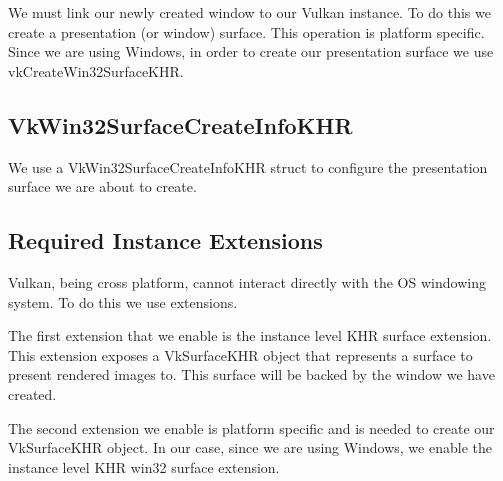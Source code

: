 We must link our newly created window to our Vulkan instance.
To do this we create a presentation (or window) surface.
This operation is platform specific.
Since we are using Windows, in order to create our presentation surface we
use vkCreateWin32SurfaceKHR.

\begin{minipage}{\linewidth}{\noindent}
    
\end{minipage}

\subsection{VkWin32SurfaceCreateInfoKHR}

We use a VkWin32SurfaceCreateInfoKHR struct to configure the presentation
surface we are about to create.

\begin{minipage}{\linewidth}{\noindent}
    
\end{minipage}

\subsection{Required Instance Extensions}

Vulkan, being cross platform, cannot interact directly with the OS windowing system.
To do this we use extensions.

The first extension that we enable is the instance level KHR surface extension.
This extension exposes a VkSurfaceKHR object that represents a surface to present
rendered images to.
This surface will be backed by the window we have created.

The second extension we enable is platform specific and is needed
to create our VkSurfaceKHR object.
In our case, since we are using Windows, we enable the instance level KHR win32
surface extension.

\begin{minipage}{\linewidth}{\noindent}
    
\end{minipage}

